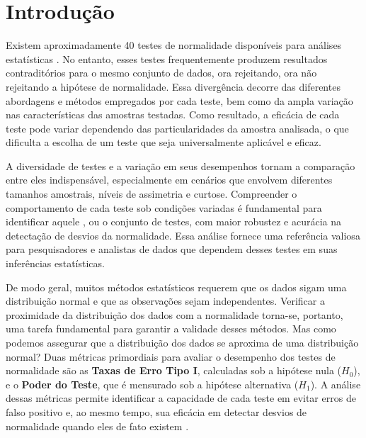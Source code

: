 \documentclass[a4paper,11pt]{article} %
\begin{document}
\section{Introdução} %

Existem aproximadamente 40 testes de normalidade disponíveis para análises estatísticas \cite{dufour1998simulation}. No entanto, esses testes frequentemente produzem resultados contraditórios para o mesmo conjunto de dados, ora rejeitando, ora não rejeitando a hipótese de normalidade. Essa divergência decorre das diferentes abordagens e métodos empregados por cada teste, bem como da ampla variação nas características das amostras testadas. Como resultado, a eficácia de cada teste pode variar dependendo das particularidades da amostra analisada, o que dificulta a escolha de um teste que seja  universalmente aplicável e eficaz.

\vspace{0.5cm}

A diversidade de testes e a variação em seus desempenhos tornam a comparação entre eles indispensável, especialmente em cenários que envolvem diferentes tamanhos amostrais, níveis de assimetria e curtose. Compreender o comportamento de cada teste sob condições variadas é fundamental para identificar aquele , ou o conjunto de testes, com maior robustez e acurácia na detectação de desvios da normalidade. Essa análise fornece uma referência valiosa para pesquisadores e analistas de dados que dependem desses testes em suas inferências estatísticas.

\vspace{0.5cm}

De modo geral, muitos métodos estatísticos requerem que os dados sigam uma distribuição normal e que as observações sejam independentes. Verificar a proximidade da distribuição dos dados com a normalidade torna-se, portanto, uma tarefa fundamental para garantir a validade desses métodos. Mas como podemos assegurar que a distribuição dos dados se aproxima de uma distribuição normal? Duas métricas primordiais para avaliar o desempenho dos testes de normalidade são as \textbf{Taxas de Erro Tipo I}, calculadas sob a hipótese nula ($H_0$), e o \textbf{Poder do Teste}, que é mensurado sob a hipótese alternativa ($H_1$). A análise dessas métricas permite identificar a capacidade de cada teste em evitar erros de falso positivo e, ao mesmo tempo, sua eficácia em detectar desvios de normalidade quando eles de fato existem \cite{cardoso2010multivariate}.

\vspace{0.5cm}
\end{document}
